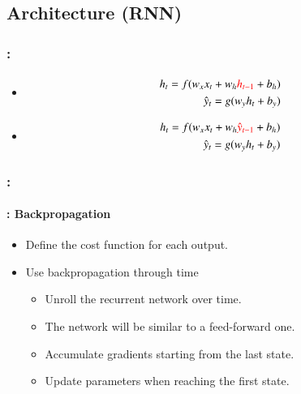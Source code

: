 \documentclass[xcolor=table]{beamer}
\begin{document}
\subsection{Architecture (RNN)}

\begin{frame}
	\frametitle{\insertshortsubtitle: \insertsection}
	\framesubtitle{\insertsubsection}
	
	\begin{minipage}{0.49\textwidth} 
		\begin{itemize}
			\item {}
			\begin{align*}
				h_t = f(w_x x_t + w_h \textcolor{red}{h_{t-1}} + b_h) \\
				\hat{y}_t = g(w_y h_t + b_y)
			\end{align*}
			\item {}
			\begin{align*}
				h_t = f(w_x x_t + w_h \textcolor{red}{\hat{y}_{t-1}} + b_h) \\
				\hat{y}_t = g(w_y h_t + b_y)
			\end{align*}
		\end{itemize}
	\end{minipage}
	\begin{minipage}{0.5\textwidth}
	\end{minipage}

\end{frame}

\begin{frame}
	\frametitle{\insertshortsubtitle: \insertsection}
	\framesubtitle{\insertsubsection: Backpropagation}
	
	\begin{itemize}
		\item Define the cost function for each output.
		\item Use backpropagation through time \cite{1990-werbos}
		\begin{itemize}
			\item Unroll the recurrent network over time.
			\item The network will be similar to a feed-forward one.
			\item Accumulate gradients starting from the last state.
			\item Update parameters when reaching the first state.
		\end{itemize}
	\end{itemize}

\end{frame}
\end{document}
